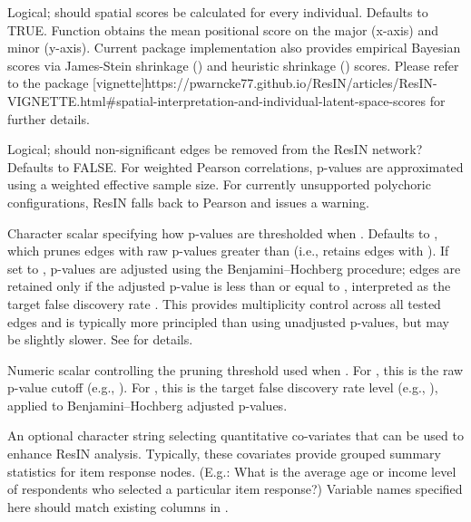 \documentclass[a4paper]{book}
\begin{document}
\begin{Arguments}
\begin{ldescription}
\item[\code{ResIN\_scores}] Logical; should spatial scores be calculated for every individual. Defaults to TRUE. Function obtains the mean positional score on the major (x-axis) and minor (y-axis). Current package implementation also provides empirical Bayesian scores via James-Stein shrinkage () and heuristic shrinkage () scores. Please refer to the package [vignette]https://pwarncke77.github.io/ResIN/articles/ResIN-VIGNETTE.html\#spatial-interpretation-and-individual-latent-space-scores for further details.

\item[\code{remove\_nonsignificant}] Logical; should non-significant edges be removed from the ResIN network? Defaults to FALSE. For weighted Pearson correlations, p-values are approximated using a weighted effective sample size. For currently unsupported polychoric configurations, ResIN falls back to Pearson and issues a warning.

\item[\code{remove\_nonsignificant\_method}] Character scalar specifying how p-values are thresholded when . Defaults to , which prunes edges with raw p-values greater than  (i.e., retains edges with ). If set to , p-values are adjusted using the Benjamini--Hochberg procedure; edges are retained only if the adjusted p-value is less than or equal to , interpreted as the target false discovery rate . This provides multiplicity control across all tested edges and is typically more principled than using unadjusted p-values, but may be slightly slower. See  for details.

\item[\code{sign\_threshold}] Numeric scalar controlling the pruning threshold used when . For , this is the raw p-value cutoff (e.g., ). For , this is the target false discovery rate level  (e.g., ), applied to Benjamini--Hochberg adjusted p-values.

\item[\code{node\_covars}] An optional character string selecting quantitative co-variates that can be used to enhance ResIN analysis. Typically, these covariates provide grouped summary statistics for item response nodes. (E.g.: What is the average age or income level of respondents who selected a particular item response?) Variable names specified here should match existing columns in .


\end{ldescription}
\end{Arguments}
\end{document}
